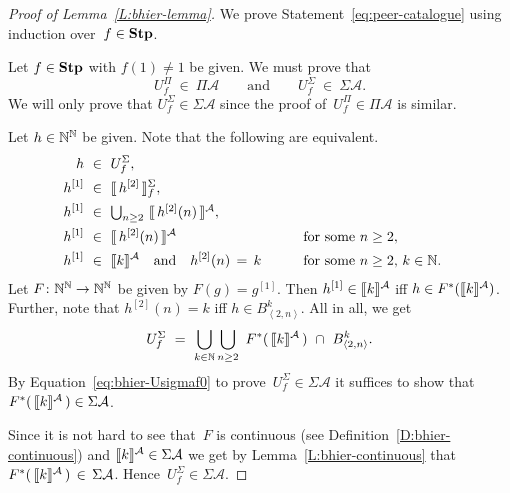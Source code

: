 \documentclass[main.tex]{subfiles}
\begin{document}
\begin{proof}[Proof of Lemma~\ref{L:bhier-lemma}]
We prove Statement~\eqref{eq:peer-catalogue} using induction 
over~$f\in\mathbf{Stp}$.

\vspace{.6em}
\noindent
Let $f\in\mathbf{Stp}$ with $f(1)\neq1$ be given.
We must prove that
\begin{equation*}
U^\Pi_f \ \in\ \Pi \mathcal{A}
\qquad\text{and}\qquad
U^\Sigma_f \ \in\ \Sigma \mathcal{A}.
\end{equation*}
We will only prove that $U^\Sigma_f \in \Sigma \mathcal{A}$
since the proof of~$U^\Pi_f \in \Pi\mathcal{A}$ is similar.

Let $h\in \mathbb{N}^{\mathbb{N}}$ be given.
Note that the following are equivalent.
\begin{alignat*}{3}
h \ &\in\ U^\Sigma_f, \\
h^{[1]} \ &\in\ \decode{\,h^{[2]}\,}^\Sigma_f, \\
h^{[1]} \ &\in\ \textstyle{\bigcup_{n\geq 2}}\ 
           \decode{\,h^{[2]}(n)\,}^\mathcal{A}, \\
h^{[1]} \ &\in\ \decode{\,h^{[2]}(n)\,}^\mathcal{A}
\qquad &&\text{for some~$n\geq 2$},\\
h^{[1]} \ &\in\ \decode{k}^\mathcal{A}
\quad\text{and}\quad
h^{[2]}(n)\,=\,k
\qquad &&\text{for some~$n\geq 2$,\  $k\in\N$}.
\end{alignat*}
Let $F\colon \mathbb{N}^{\mathbb{N}}\rightarrow\mathbb{N}^{\mathbb{N}}$
be given by $F(g)=g^{[1]}$.
Then $h^{[1]} \in \decode{k}^{\mathcal{A}}$
iff $h\in F^*(\decode{k}^\mathcal{A})$.
Further, note that $h^{[2]}(n)=k$ iff $h\in B^{k}_{\left<2,n\right>}$.
All in all, we get 
\begin{equation}
\label{eq:bhier-Usigmaf0}
U^\Sigma_f
\ =\ 
\bigcup_{k\in\N} \bigcup_{n\geq 2}
\ F^*(\,\decode{k}^\mathcal{A}\,) \ \cap\  B^k_{\left<2,n\right>}.
\end{equation}
By Equation~\eqref{eq:bhier-Usigmaf0}
to prove~$U^\Sigma_f \in\Sigma \mathcal{A}$
it suffices to show 
that~$F^*(\,\decode{k}^\mathcal{A}\,) \in \Sigma\mathcal{A}$.

Since it is not hard to see that~$F$ is continuous
(see Definition~\ref{D:bhier-continuous})
and $\decode{k}^\mathcal{A} \in \Sigma\mathcal{A}$
we get by Lemma~\ref{L:bhier-continuous} that
$F^*(\,\decode{k}^\mathcal{A}\,) \,\in\, \Sigma\mathcal{A}$.
Hence~$U^\Sigma_f \in \Sigma\mathcal{A}$.


\end{proof}
\end{document}
